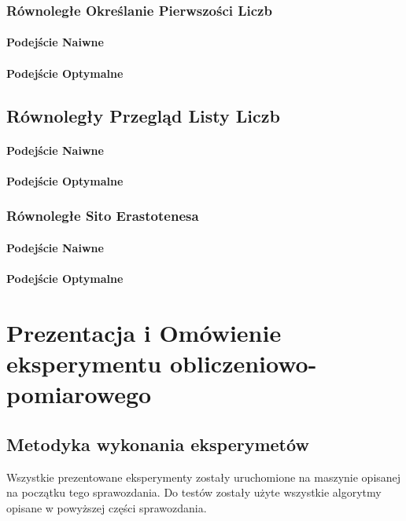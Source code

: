 \documentclass{article}
\begin{document}
            \subsubsection{Równoległe Określanie Pierwszości Liczb}
                \paragraph{Podejście Naiwne}
                \paragraph{Podejście Optymalne}
            \subsection{Równoległy Przegląd Listy Liczb}
                \paragraph{Podejście Naiwne}
                \paragraph{Podejście Optymalne}
            \subsubsection{Równoległe Sito Erastotenesa}
                \paragraph{Podejście Naiwne}
                \paragraph{Podejście Optymalne}
    
    \section{Prezentacja i Omówienie eksperymentu obliczeniowo-pomiarowego}
        \subsection{Metodyka wykonania eksperymetów}
                Wszystkie prezentowane eksperymenty zostały uruchomione na maszynie opisanej na początku tego sprawozdania. Do testów zostały użyte wszystkie algorytmy opisane w powyższej części sprawozdania.
                
\end{document}
